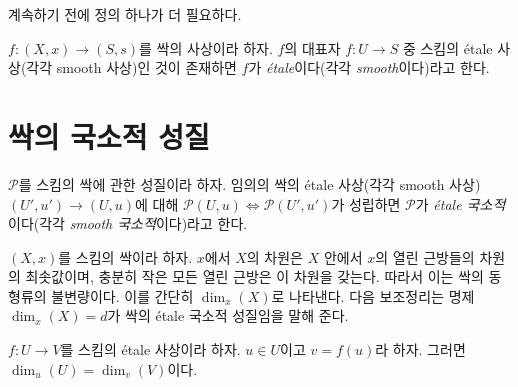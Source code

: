 \noindent
계속하기 전에 정의 하나가 더 필요하다.

\begin{definition}
\label{definition-etale-morphism-germs}
$f : (X, x) \to (S, s)$를 싹의 사상이라 하자. $f$의 대표자
$f : U \to S$ 중 스킴의 \'etale 사상(각각 smooth 사상)인 것이 존재하면
$f$가 {\it \'etale}이다(각각 {\it smooth}이다)라고 한다.
\end{definition}








\section{싹의 국소적 성질}
\label{section-properties-germs-local}

\begin{definition}
\label{definition-local-at-point}
$\mathcal{P}$를 스킴의 싹에 관한 성질이라 하자. 임의의 싹의
\'etale 사상(각각 smooth 사상) $(U', u') \to (U, u)$에 대해
$\mathcal{P}(U, u) \Leftrightarrow \mathcal{P}(U', u')$가 성립하면
$\mathcal{P}$가 {\it \'etale 국소적}이다(각각 {\it smooth 국소적}이다)라고 한다.
\end{definition}

\noindent
$(X, x)$를 스킴의 싹이라 하자. $x$에서 $X$의 차원은 $X$ 안에서
$x$의 열린 근방들의 차원의 최솟값이며, 충분히 작은 모든 열린 근방은
이 차원을 갖는다. 따라서 이는 싹의 동형류의 불변량이다. 이를 간단히
$\dim_x(X)$로 나타낸다. 다음 보조정리는 명제 $\dim_x(X) = d$가 싹의
\'etale 국소적 성질임을 말해 준다.

\begin{lemma}
\label{lemma-dimension-at-point-local}
$f : U \to V$를 스킴의 \'etale 사상이라 하자. $u \in U$이고
$v = f(u)$라 하자. 그러면 $\dim_u(U) = \dim_v(V)$이다.
\end{lemma}

